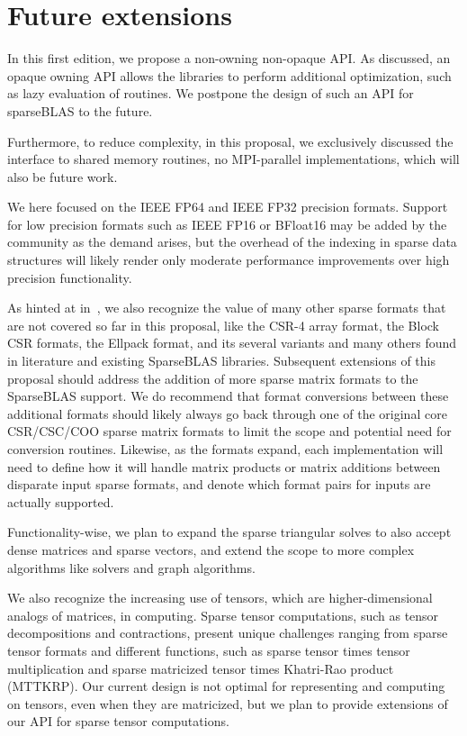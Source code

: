 \documentclass[manuscript,review]{acmart}
\begin{document}
\section{Future extensions}

In this first edition, we propose a non-owning non-opaque API. As discussed, an opaque owning API allows the libraries to perform additional optimization, such as lazy evaluation of routines. We postpone the design of such an API for sparseBLAS to the future. 


Furthermore, to reduce complexity, in this proposal, we exclusively discussed the interface to shared memory routines, no MPI-parallel implementations, which will also be future work.

We here focused on the IEEE FP64 and IEEE FP32 precision formats. Support for low precision formats such as IEEE FP16 or BFloat16 may be added by the community as the demand arises, but the overhead of the indexing in sparse data structures will likely render only moderate performance improvements over high precision functionality.

As hinted at in~, we also recognize the value of many other sparse formats that are not covered so far in this proposal, like the CSR-4 array format, the Block CSR formats, the Ellpack format, and its several variants and many others found in literature and existing SparseBLAS libraries.  Subsequent extensions of this proposal should address the addition of more sparse matrix formats to the SparseBLAS support.  We do recommend that format conversions between these additional formats should likely always go back through one of the original core CSR/CSC/COO sparse matrix formats to limit the scope and potential need for conversion routines.  Likewise, as the formats expand, each implementation will need to define how it will handle matrix products or matrix additions between disparate input sparse formats, and denote which format pairs for inputs are actually supported.


Functionality-wise, we plan to expand the sparse triangular solves to also accept dense matrices and sparse vectors, and extend the scope to more complex algorithms like solvers and graph algorithms.

We also recognize the increasing use of tensors, which are higher-dimensional analogs of matrices, in computing. 
Sparse tensor computations, such as tensor decompositions and contractions, present unique challenges ranging from sparse tensor formats and different functions, such as sparse tensor times tensor multiplication and sparse matricized tensor times Khatri-Rao product (MTTKRP).
Our current design is not optimal for representing and computing on tensors, even when they are matricized, but we plan to provide extensions of our API for sparse tensor computations.
\end{document}
